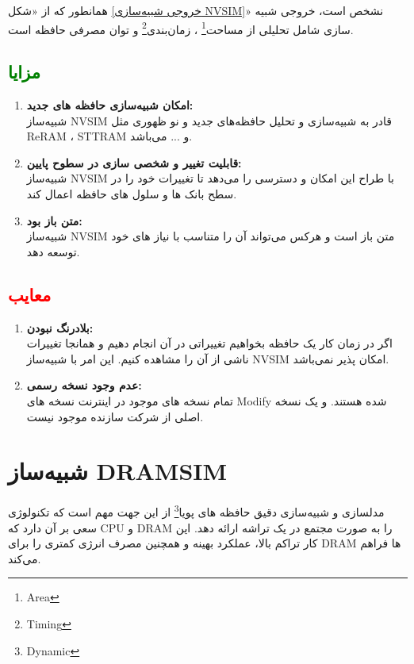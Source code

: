 \documentclass[12pt]{exam}
\begin{document}
\begin{questions}
همانطور که از «شکل \textcolor{blue}{\ref{خروجی شبیه‌سازی NVSIM}}» نشخص است، خروجی شبیه سازی شامل تحلیلی از مساحت\footnote{Area} ، زمان‌بندی\footnote{Timing} و توان مصرفی حافظه است.




\subsection{\textcolor{green}{مزایا}}
\begin{enumerate}
	\item \textbf{امکان شبیه‌سازی حافظه های جدید: }\\
	شبیه‌ساز NVSIM قادر به شبیه‌سازی و تحلیل حافظه‌های جدید و نو ظهوری مثل ReRAM ، STTRAM و ... می‌باشد.
	
	
	\item \textbf{قابلیت تغییر و شخصی سازی در سطوح پایین: }\\
	شبیه‌ساز NVSIM با طراح این امکان و دسترسی را می‌دهد تا تغییرات خود را در سطح بانک ها و سلول های حافظه اعمال کند.
	
	\item \textbf{متن باز بود: }\\
	شبیه‌ساز NVSIM متن باز است و هرکس می‌تواند آن را متناسب با نیاز های خود توسعه دهد.
\end{enumerate}


\subsection{\textcolor{red}{معایب}}
\begin{enumerate}
	\item \textbf{بلادرنگ نبودن: }\\
	اگر در زمان کار یک حافظه بخواهیم تغییراتی در آن انجام دهیم و همانجا تغییرات ناشی از آن را مشاهده کنیم. این امر با شبیه‌ساز NVSIM امکان پذیر نمی‌باشد.
	
	\item \textbf{عدم وجود نسخه رسمی: }\\
	تمام نسخه های موجود در اینترنت نسخه های Modify شده هستند. و یک نسخه اصلی از شرکت سازنده موجود نیست.
\end{enumerate}





\section{شبیه‌ساز DRAMSIM}
مدلسازی و شبیه‌سازی دقیق حافظه های پویا\footnote{Dynamic} از این جهت مهم است که تکنولوژی سعی بر آن دارد که CPU و DRAM را به صورت مجتمع در یک تراشه ارائه دهد. این کار تراکم بالا، عملکرد بهینه و همچنین مصرف انرژی کمتری را برای DRAM ها فراهم می‌کند. \\


\end{questions}
\end{document}

